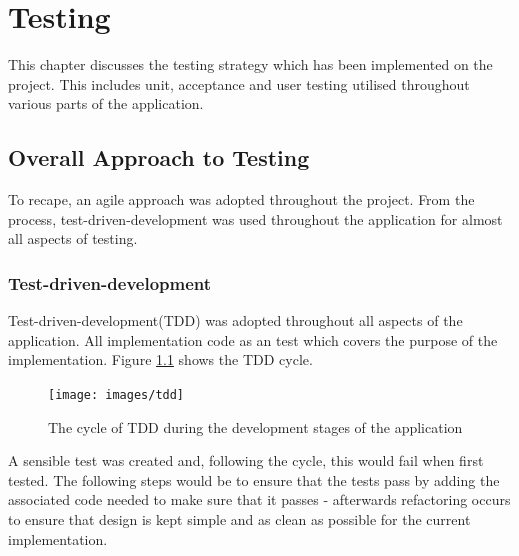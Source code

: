 \chapter{Testing}




This chapter discusses the testing strategy which has been implemented on the project. This includes unit, acceptance and user testing utilised throughout various parts of the application.

\section{Overall Approach to Testing}
To recape, an agile approach was adopted throughout the project. From the process, test-driven-development was used throughout the application for almost all aspects of testing.

\subsection{Test-driven-development}
Test-driven-development(TDD) was adopted throughout all aspects of the application. All implementation code as an test which covers the purpose of the implementation. Figure \ref{fig:tdd} shows the TDD cycle.

\begin{figure}
  \texttt{[image: images/tdd]}
  \centering
  \caption{The cycle of TDD during the development stages of the application}
  \label{fig:tdd}
\end{figure}

A sensible test was created and, following the cycle, this would fail when first tested. The following steps would be to ensure that the tests pass by adding the associated code needed to make sure that it passes - afterwards refactoring occurs to ensure that design is kept simple and as clean as possible for the current implementation.

